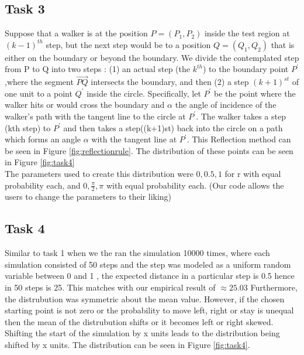 \documentclass[a4paper, 11pt]{book} %
\begin{document}
\subsection*{Task 3}

Suppose that a walker is at the position $P = (P_1,P_2)$ inside the test region at $(k-1)^{th}$ step, but
the next step would be to a position $ Q = (Q_1,Q_2) $ that is either on the boundary or beyond the 
boundary. We divide the contemplated step from P to Q into two steps  : (1) an
actual step (the $k^{th}$) to the boundary point $P^{\prime}$,where the segment $\vec{PQ} $ intersects the boundary,  and then (2)
a step $(k+1)^{st}$ of one unit to a point $Q^{\prime}$ inside the circle. Specifically, let $P^{\prime}$ be the
point where the walker hits or would cross the boundary and $\alpha$ the angle of incidence of the walker's path
with the tangent line to the circle at  $P^{\prime}$. The walker takes a step (kth step) to $P^{\prime}$ and then takes a step((k+1)st) back into the 
circle on a path which forms an angle $\alpha$ with the tangent line at $P^{\prime}$. This Reflection method can be seen in Figure \ref{fig:reflectionrule}.
The distribution of these points can be seen in Figure  \ref{fig:task4}
\\ The parameters used to create this distribution were \(0,0.5,1\) for r with equal probability each, and \(0,\frac{\pi}{2}, \pi\) with equal probability each. (Our code allows the users to change the parameters to their liking)





\subsection*{Task 4}

Similar to task 1 when we the ran the simulation 10000 times, where each simulation consisted of 50 steps and the step was modeled as a uniform random variable between 0 and 1 , the expected distance in a particular step is 0.5 hence in 50 steps is 25. This matches with our empirical result of \(\approx 25.03 \)
Furthermore, the distrubution was symmetric about the mean value. However, if the chosen starting point is not zero or the probability to move left, right or stay is unequal then the mean of the distrubution shifts or it becomes left or right skewed. Shifting the start of the simulation by x units leads to the distribution being shifted by x units. The distribution can be seen in Figure \ref{fig:task4}.
\end{document}
